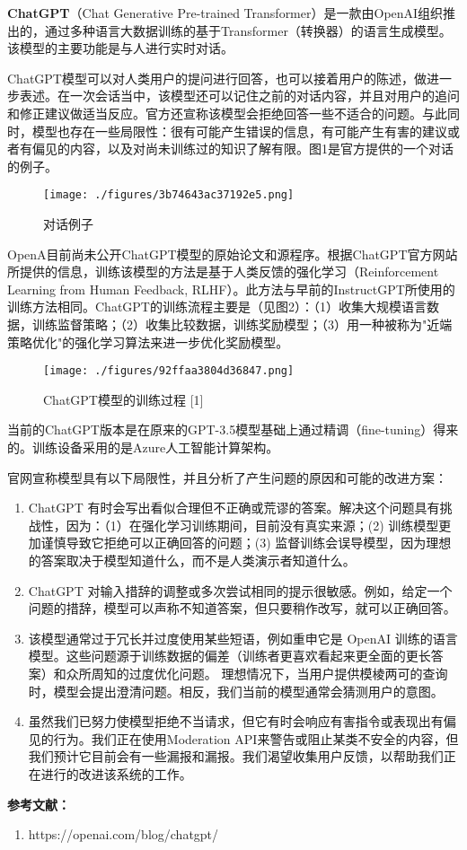 

\textbf{ChatGPT}（Chat Generative Pre-trained Transformer）是一款由OpenAI组织推出的，通过多种语言大数据训练的基于Transformer（转换器）的语言生成模型。该模型的主要功能是与人进行实时对话。

ChatGPT模型可以对人类用户的提问进行回答，也可以接着用户的陈述，做进一步表述。在一次会话当中，该模型还可以记住之前的对话内容，并且对用户的追问和修正建议做适当反应。官方还宣称该模型会拒绝回答一些不适合的问题。与此同时，模型也存在一些局限性：很有可能产生错误的信息，有可能产生有害的建议或者有偏见的内容，以及对尚未训练过的知识了解有限。图1是官方提供的一个对话的例子。

\begin{figure}[ht]
\centering
\texttt{[image: ./figures/3b74643ac37192e5.png]}
\caption{对话例子} \label{fig_ChGPT_2}
\end{figure}

OpenA目前尚未公开ChatGPT模型的原始论文和源程序。根据ChatGPT官方网站所提供的信息，训练该模型的方法是基于人类反馈的强化学习（Reinforcement Learning from Human Feedback, RLHF）。此方法与早前的InstructGPT所使用的训练方法相同。ChatGPT的训练流程主要是（见图2）：（1）收集大规模语言数据，训练监督策略；（2）收集比较数据，训练奖励模型；（3）用一种被称为"近端策略优化"的强化学习算法来进一步优化奖励模型。
\begin{figure}[ht]
\centering
\texttt{[image: ./figures/92ffaa3804d36847.png]}
\caption{ChatGPT模型的训练过程 [1]} \label{fig_ChGPT_1}
\end{figure}
当前的ChatGPT版本是在原来的GPT-3.5模型基础上通过精调（fine-tuning）得来的。训练设备采用的是Azure人工智能计算架构。

官网宣称模型具有以下局限性，并且分析了产生问题的原因和可能的改进方案：
\begin{enumerate}
\item ChatGPT 有时会写出看似合理但不正确或荒谬的答案。解决这个问题具有挑战性，因为：（1）在强化学习训练期间，目前没有真实来源；(2) 训练模型更加谨慎导致它拒绝可以正确回答的问题；(3) 监督训练会误导模型，因为理想的答案取决于模型知道什么，而不是人类演示者知道什么。
\item ChatGPT 对输入措辞的调整或多次尝试相同的提示很敏感。例如，给定一个问题的措辞，模型可以声称不知道答案，但只要稍作改写，就可以正确回答。
\item 该模型通常过于冗长并过度使用某些短语，例如重申它是 OpenAI 训练的语言模型。这些问题源于训练数据的偏差（训练者更喜欢看起来更全面的更长答案）和众所周知的过度优化问题。
理想情况下，当用户提供模棱两可的查询时，模型会提出澄清问题。相反，我们当前的模型通常会猜测用户的意图。
\item 虽然我们已努力使模型拒绝不当请求，但它有时会响应有害指令或表现出有偏见的行为。我们正在使用Moderation API来警告或阻止某类不安全的内容，但我们预计它目前会有一些漏报和漏报。我们渴望收集用户反馈，以帮助我们正在进行的改进该系统的工作。
\end{enumerate}



\textbf{参考文献：}
\begin{enumerate}
\item https://openai.com/blog/chatgpt/
\end{enumerate}